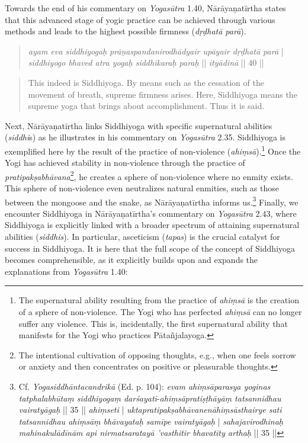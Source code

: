 Towards the end of his commentary on \textit{Yogasūtra} 1.40, Nārāyaṇatīrtha states that this advanced stage of yogic practice can be achieved through various methods and leads to the highest possible firmness (\textit{dṛḍhatā parā}).

\begin{quote}
  \textit{ayam eva siddhiyogaḥ}
  \textit{prāṇaspandanirodhādyair upāyair dṛḍhatā parā} | 
  \textit{siddhiyogo bhaved atra yogaḥ siddhikaraḥ paraḥ} ||
  \textit{ityādinā} || 40 ||
\end{quote}
\begin{quote}
  This indeed is Siddhiyoga. By means such as the cessation of the movement of breath, supreme firmness arises. Here, Siddhiyoga means the supreme yoga that brings about accomplishment. Thus it is said.
\end{quote}

Next, Nārāyaṇatīrtha links Siddhiyoga with specific supernatural abilities (\textit{siddhi}s) as he illustrates in his commentary on \textit{Yogasūtra} 2.35. Siddhiyoga is exemplified here by the result of the practice of non-violence (\textit{ahiṃsā}).\footnote{The supernatural ability resulting from the practice of \textit{ahiṃsā} is the creation of a sphere of non-violence. The Yogi who has perfected \textit{ahiṃsā} can no longer suffer any violence. This is, incidentally, the first supernatural ability that manifests for the Yogi who practices Pātañjalayoga.} Once the Yogi has achieved stability in non-violence through the practice of \textit{pratipakṣabhāvana}\footnote{The intentional cultivation of opposing thoughts, e.g., when one feels sorrow or anxiety and then concentrates on positive or pleasurable thoughts.}, he creates a sphere of non-violence where no enmity exists. This sphere of non-violence even neutralizes natural enmities, such as those between the mongoose and the snake, as Nārāyaṇatīrtha informs us.\footnote{Cf. \textit{Yogasiddhāntacandrikā} (Ed. p. 104): \textit{evam ahiṃsāparasya yoginas tatphalabhūtaṃ siddhiyogaṃ darśayati}-\textit{ahiṃsāpratiṣṭhāyāṃ tatsannidhau vairatyāgaḥ} || 35 || \textit{ahiṃseti} | \textit{uktapratipakṣabhāvanenāhiṃsāsthairye sati tatsannidhau ahiṃsāṃ bhāvayataḥ samīpe vairatyāgaḥ} | \textit{sahajavirodhinaḥ mahinakulādīnām api nirmatsaratayā 'vasthitir bhavatīty arthaḥ} || 35 ||}
Finally, we encounter Siddhiyoga in Nārāyaṇatīrtha’s commentary on \textit{Yogasūtra} 2.43, where Siddhiyoga is explicitly linked with a broader spectrum of attaining supernatural abilities (\textit{siddhis}). In particular, asceticism (\textit{tapas}) is the crucial catalyst for success in Siddhiyoga. It is here that the full scope of the concept of Siddhiyoga becomes comprehensible, as it explicitly builds upon and expands the explanations from \textit{Yogasūtra} 1.40:

